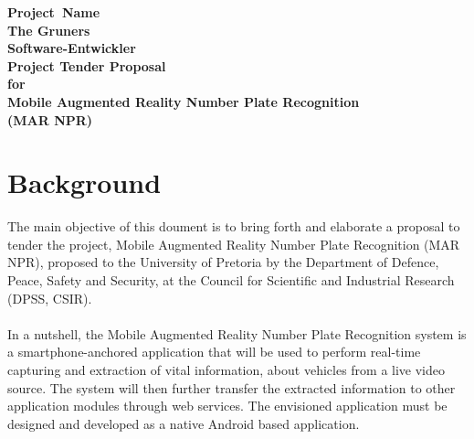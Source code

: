 \documentclass[12pt]{article}
\newcommand{\Title}{Project\ Name} %
\begin{document}
        \vspace{4em}
        
        \begin{center}%
        
          \LARGE \bf \Title \\[4em]
          \LARGE {\bf The Gruners}\\[1em]
          \LARGE {\bf Software-Entwickler}\\[2em]
          \large 
          			Project Tender Proposal \\[1em]
          			for\\[1em]
          			Mobile Augmented Reality Number Plate Recognition \\[1em]
          			(MAR NPR)\\[1em]
          			
            
        \end{center}%
        

        \newpage
        \tableofcontents    
                \newpage
                \section{Background}
               		The main objective of this doument is to bring forth and elaborate a proposal to tender the project, Mobile Augmented Reality Number Plate Recognition (MAR NPR), proposed to the University of Pretoria by the Department of Defence, Peace, Safety and Security, at the Council for Scientific and Industrial Research (DPSS, CSIR).
               		\\
               		\\ In a nutshell, the Mobile Augmented Reality Number Plate Recognition system is a smartphone-anchored application that will be used to perform real-time capturing and extraction of vital information, about vehicles from a live video source. The system will then further transfer the extracted information to other application modules through web services. The envisioned application must be designed and developed as a native Android based application.
               	
               	
               	\newpage	
               		
\end{document}
